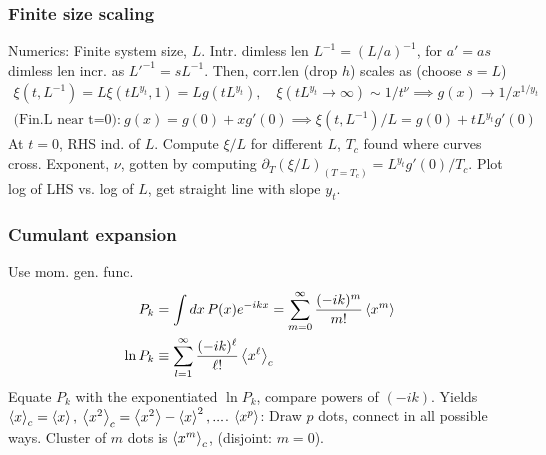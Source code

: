 \documentclass[a4paper, english, 12pt]{article}
\begin{document}
\begin{multicols*}{2}
\subsubsection*{\tiny Finite size scaling}
Numerics: Finite system size, $L$. Intr. dimless len $L^{-1}=(L/a)^{-1}$, for $a'=as$ dimless len incr. as $L'^{-1}=sL^{-1}$. Then, corr.len (drop $h$) scales as (choose $s=L$)
\begin{align*}
    \xi(t,L^{-1}) = L \xi(t L^{y_t},1)=L g(tL^{y_t}),\quad \xi(tL^{y_t}\to\infty)\sim 1/t^\nu \implies g(x)\to 1/x^{1/y_t} \\
    \text{(Fin.L near t=0):}\: g(x)=g(0)+x g'(0) \implies \xi(t,L^{-1})/L = g(0) + tL^{y_t} g'(0)
\end{align*}  
At $t=0$, RHS ind. of $L$. Compute $\xi/L$ for different $L$, $T_c$ found where curves cross. Exponent, $\nu$, gotten by computing $\partial_T(\xi/L)_{(T=T_c)}=L^{y_t}g'(0)/T_c$. Plot log of LHS vs. log of $L$, get straight line with slope $y_t$. 

\subsubsection*{\scriptsize Cumulant expansion}

Use mom. gen. func. 
\begin{align*}
    P_k&=\int dx\, P(x)e^{-ikx} = \sum_{m=0}^\infty \frac{(-ik)^m}{m!}\expval{x^m} \\
    \ln P_k &\equiv \sum_{l=1}^\infty \frac{(-ik)^\ell}{\ell!} \expval{x^\ell}_c
\end{align*}
Equate $P_k$ with the exponentiated $\ln P_k$, compare powers of $(-ik)$. Yields $\expval{x}_c=\expval{x},\:\expval{x^2}_c=\expval{x^2}-\expval{x}^2,...$. $\expval{x^p}$: Draw $p$ dots, connect in all possible ways. Cluster of $m$ dots is $\expval{x^m}_c$, (disjoint: $m=0$). 


\end{multicols*}
\end{document}
